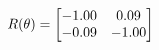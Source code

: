 \documentclass[preview]{standalone}
\begin{document}
\begin{align*}
\special{dvisvgm:raw <g id='unique000'>}R(\theta) = \begin{bmatrix}-1.00 & 0.09\\-0.09 & -1.00\end{bmatrix}\special{dvisvgm:raw </g>}
\end{align*}
\end{document}

